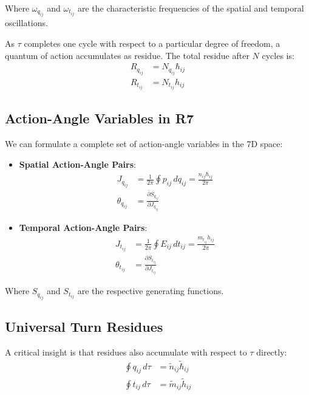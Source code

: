 \documentclass{article}
\begin{document}
Where $\omega_{q_{ij}}$ and $\omega_{t_{ij}}$ are the characteristic frequencies of the spatial and temporal oscillations.

As $\tau$ completes one cycle with respect to a particular degree of freedom, a quantum of action accumulates as residue. The total residue after $N$ cycles is:
\begin{align}
R_{q_{ij}} &= N_{q_{ij}} \hbar_{ij} \\
R_{t_{ij}} &= N_{t_{ij}} h_{ij}
\end{align}

\subsection{Action-Angle Variables in R7}

We can formulate a complete set of action-angle variables in the 7D space:

\begin{itemize}
\item \textbf{Spatial Action-Angle Pairs}:
\begin{align}
J_{q_{ij}} &= \frac{1}{2\pi}\oint p_{ij} \, dq_{ij} = \frac{n_{ij}\hbar_{ij}}{2\pi} \\
\theta_{q_{ij}} &= \frac{\partial S_{q_{ij}}}{\partial J_{q_{ij}}}
\end{align}

\item \textbf{Temporal Action-Angle Pairs}:
\begin{align}
J_{t_{ij}} &= \frac{1}{2\pi}\oint E_{ij} \, dt_{ij} = \frac{m_{t_{ij}}h_{ij}}{2\pi} \\
\theta_{t_{ij}} &= \frac{\partial S_{t_{ij}}}{\partial J_{t_{ij}}}
\end{align}
\end{itemize}

Where $S_{q_{ij}}$ and $S_{t_{ij}}$ are the respective generating functions.

\subsection{Universal Turn Residues}

A critical insight is that residues also accumulate with respect to $\tau$ directly:
\begin{align}
\oint q_{ij} \, d\tau &= \tilde{n}_{ij} \tilde{\hbar}_{ij} \\
\oint t_{ij} \, d\tau &= \tilde{m}_{ij} \tilde{h}_{ij}
\end{align}
\end{document}

